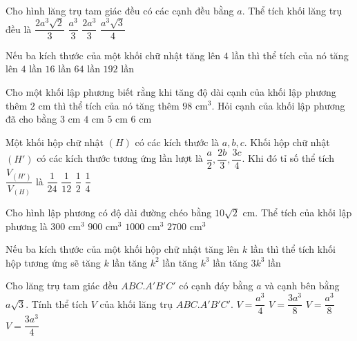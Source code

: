 \begin{ex}%
	Cho hình lăng trụ tam giác đều có các cạnh đều bằng $a$. Thể tích khối lăng trụ đều là
	\choice
	{$\dfrac{2a^3\sqrt{2}}{3}$}
	{$\dfrac{a^3}{3}$}
	{$\dfrac{2a^3}{3}$}
	{\True $\dfrac{a^3\sqrt{3}}{4}$}
\end{ex}

\begin{ex}%
	Nếu ba kích thước của một khối chữ nhật tăng lên $4$ lần thì thể tích của nó tăng lên
	\choice
	{$4$ lần}
	{$16$ lần}
	{\True $64$ lần}
	{$192$ lần}
\end{ex}


\begin{ex}%
	Cho một khối lập phương biết rằng khi tăng độ dài cạnh của khối lập phương thêm $2$ cm thì thể tích của nó tăng thêm $98$ cm$^3$. Hỏi cạnh của khối lập phương đã cho bằng
	\choice
	{\True $3$ cm}
	{$4$ cm}
	{$5$ cm}
	{$6$ cm}
\end{ex}


\begin{ex}%
	Một khối hộp chữ nhật $(H)$ có các kích thước là $a,b,c$. Khối hộp chữ nhật $(H')$ có các kích thước tương ứng lần lượt là $\dfrac{a}{2},\dfrac{2b}{3},\dfrac{3c}{4}$. Khi đó tỉ số thể tích $\dfrac{V_{(H')}}{V_{(H)}}$ là
	\choice
	{$\dfrac{1}{24}$}
	{$\dfrac{1}{12}$}
	{$\dfrac{1}{2}$}
	{\True $\dfrac{1}{4}$}
\end{ex}


\begin{ex}%
	Cho hình lập phương có độ dài đường chéo bằng $10\sqrt{2}$ cm. Thể tích của khối lập phương là 
	\choice
	{$300$ cm$^3$}
	{$900$ cm$^3$}
	{\True $1000$ cm$^3$}
	{$2700$ cm$^3$}
\end{ex}

\begin{ex}%
	Nếu ba kích thước của một khối hộp chữ nhật tăng lên $k$ lần thì thể tích khối hộp tương ứng sẽ
	\choice
	{tăng $k$ lần}
	{tăng $k^2$ lần}
	{\True tăng $k^3$ lần}
	{tăng $3k^3$ lần}
\end{ex}


\begin{ex}%
	Cho lăng trụ tam giác đều $ABC.A'B'C'$ có cạnh đáy bằng $a$ và cạnh bên bằng $a\sqrt{3}$. Tính thể tích $V$ của khối lăng trụ $ABC.A'B'C'$. 
	\choice
	{$V=\dfrac{a^3}{4}$}
	{$V=\dfrac{3a^3}{8}$}
	{$V=\dfrac{a^3}{8}$}
	{\True $V=\dfrac{3a^3}{4}$}
\end{ex}

